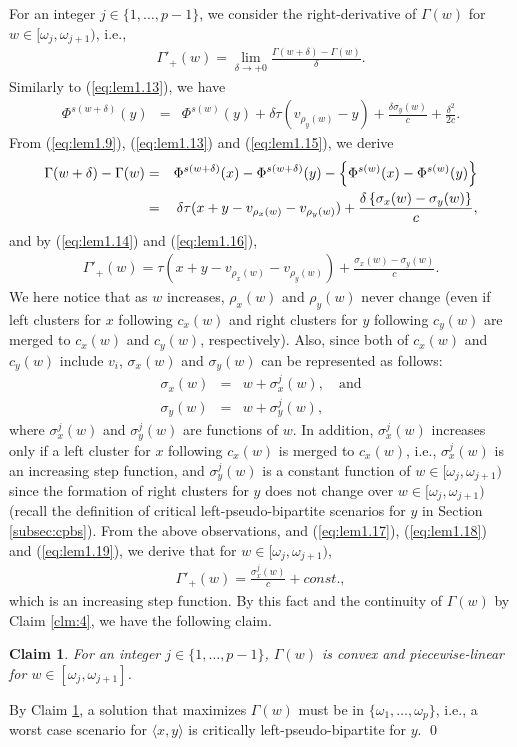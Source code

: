 \documentclass[a4paper]{llncs}
\newtheorem{clm}{Claim}
\begin{document}
For an integer $j \in \{1, \ldots, p-1\}$, we consider the right-derivative of $\Gamma(w)$ for $w \in [\omega_j, \omega_{j+1})$, i.e.,
\begin{eqnarray}
\Gamma'_+(w) = \lim_{\delta \to +0} \frac{\Gamma(w+\delta)-\Gamma(w)}{\delta}.
\label{eq:lem1.14}
\end{eqnarray}
Similarly to (\ref{eq:lem1.13}), we have
\begin{eqnarray}
\Phi^{s(w+\delta)}(y)	&=& \Phi^{s(w)}(y) +  \delta\tau(v_{\rho_y(w)}-y) + \frac{\delta\sigma_y(w)}{c} + \frac{\delta^2}{2c}. \label{eq:lem1.15} 
\end{eqnarray}
From (\ref{eq:lem1.9}), (\ref{eq:lem1.13}) and (\ref{eq:lem1.15}), we derive
\begin{eqnarray}
\Gamma(w+\delta)-\Gamma(w)	&=&	\Phi^{s(w+\delta)}(x)-\Phi^{s(w+\delta)}(y)- \left\{ \Phi^{s(w)}(x)-\Phi^{s(w)}(y) \right\} \notag \\
						&=&	\delta\tau(x + y - v_{\rho_x(w)} - v_{\rho_y(w)}) + \frac{\delta\left\{ \sigma_x(w)-\sigma_y(w) \right\}}{c},		
\label{eq:lem1.16} 
\end{eqnarray}
and by (\ref{eq:lem1.14}) and (\ref{eq:lem1.16}),
\begin{eqnarray}
\Gamma'_+(w)	=	\tau(x + y - v_{\rho_x(w)} - v_{\rho_y(w)}) + \frac{\sigma_x(w)-\sigma_y(w)}{c}.	
\label{eq:lem1.17} 
\end{eqnarray}
We here notice that as $w$ increases, $\rho_x(w)$ and $\rho_y(w)$ never change (even if left clusters for $x$ following $c_x(w)$ and right clusters for $y$ following $c_y(w)$ are merged to $c_x(w)$ and $c_y(w)$, respectively).
Also, since both of $c_x(w)$ and $c_y(w)$ include $v_i$, 
$\sigma_x(w)$ and $\sigma_y(w)$ can be represented as follows:
\begin{eqnarray}
\sigma_x(w)	&=& w + \sigma^j_x(w), \quad \mbox{and} \label{eq:lem1.18} \\
\sigma_y(w)	&=& w + \sigma^j_y(w), \label{eq:lem1.19} 
\end{eqnarray}
where $\sigma^j_x(w)$ and $\sigma^j_y(w)$ are functions of $w$.
In addition, $\sigma^j_x(w)$ increases only if a left cluster for $x$ following $c_x(w)$ is merged to $c_x(w)$, 
i.e., $\sigma^j_x(w)$ is an increasing step function,
and $\sigma^j_y(w)$ is a constant function of $w \in [\omega_j, \omega_{j+1})$ since the formation of right clusters for $y$ does not change over $w \in [\omega_j, \omega_{j+1})$
(recall the definition of critical left-pseudo-bipartite scenarios for $y$ in Section \ref{subsec:cpbs}).
From the above observations, and (\ref{eq:lem1.17}), (\ref{eq:lem1.18}) and (\ref{eq:lem1.19}), we derive that for $w \in [\omega_j, \omega_{j+1})$,
\begin{eqnarray}
\Gamma'_+(w)	=	\frac{\sigma^j_x(w)}{c} + const.,
\label{eq:lem1.20} 
\end{eqnarray}
which is an increasing step function.
By this fact and the continuity of $\Gamma(w)$ by Claim \ref{clm:4}, we have the following claim.
\begin{clm}
For an integer $j \in \{1, \ldots, p-1\}$, $\Gamma(w)$ is convex and piecewise-linear for $w \in [\omega_j, \omega_{j+1}]$.
\label{clm:5}
\end{clm}

By Claim \ref{clm:5}, a solution that maximizes $\Gamma(w)$ must be in $\{ \omega_1, \ldots, \omega_p \}$,
i.e., a worst case scenario for $\langle x, y \rangle$ is critically left-pseudo-bipartite for $y$.
\qed
\end{document}
